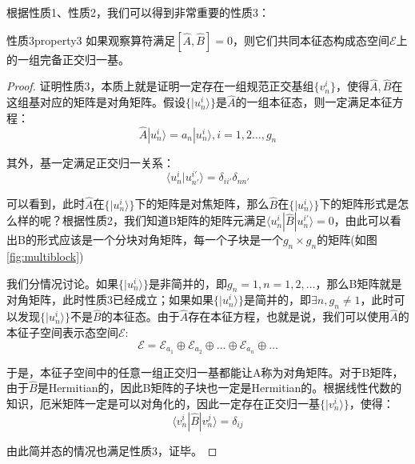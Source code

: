     根据性质1、性质2，我们可以得到非常重要的性质3：
    \begin{theorem}{性质3}{property3}
        如果观察算符满足$[\hat{A},\hat{B}]=0$，则它们共同本征态构成态空间$\mathscr{E}$上的一组完备正交归一基。
    \end{theorem}
    \begin{proof}
        证明性质3，本质上就是证明一定存在一组规范正交基组$\{v_n^i\}$，使得$\hat{A},\hat{B}$在这组基对应的矩阵是对角矩阵。假设$\{|u_n^i\rangle\}$是$\hat{A}$的一组本征态，则一定满足本征方程：
        \begin{equation}
            \hat{A}|u_n^i\rangle=a_n|u_n^i\rangle,i=1,2\dots,g_n
        \end{equation}
        
        其外，基一定满足正交归一关系：
        \begin{equation}
            \langle u_n^i|u_{n'}^{i'}\rangle=\delta_{ii'}\delta_{nn'}
        \end{equation}
        
        可以看到，此时$\hat{A}$在$\{|u_n^i\rangle\}$下的矩阵是对焦矩阵，那么$\hat{B}$在$\{|u_n^i\rangle\}$下的矩阵形式是怎么样的呢？根据性质2，我们知道B矩阵的矩阵元满足$\langle u_n^i|\hat{B}|u_n^{i'}\rangle=0$，由此可以看出B的形式应该是一个分块对角矩阵，每一个子块是一个$g_n\times g_n$的矩阵(如图\ref{fig:multiblock})
       
        我们分情况讨论。如果$\{|u_n^i\rangle\}$是非简并的，即$g_n=1,n=1,2,\dots$，那么B矩阵就是对角矩阵，此时性质3已经成立；如果如果$\{|u_n^i\rangle\}$是简并的，即$\exists n,g_n\ne1$，此时可以发现$\{|u_n^i\rangle\}$不是$\hat{B}$的本征态。由于$\hat{A}$存在本征方程，也就是说，我们可以使用$\hat{A}$的本征子空间表示态空间$\mathscr{E}$:
        \begin{equation}
            \mathscr{E}=\mathscr{E}_{a_1}\oplus \mathscr{E}_{a_2}\oplus\dots\oplus \mathscr{E}_{a_n}\oplus\dots
        \end{equation}
        
        于是，本征子空间中的任意一组正交归一基都能让A称为对角矩阵。对于B矩阵，由于$\hat{B}$是Hermitian的，因此B矩阵的子块也一定是Hermitian的。根据线性代数的知识，厄米矩阵一定是可以对角化的，因此一定存在正交归一基$\{|v_n^i\rangle\}$，使得：
        \begin{equation}
            \langle v_n^i|\hat{B}|v_n^j\rangle=\delta_{ij}
        \end{equation}
        
        由此简并态的情况也满足性质3，证毕。
        

\end{proof}
